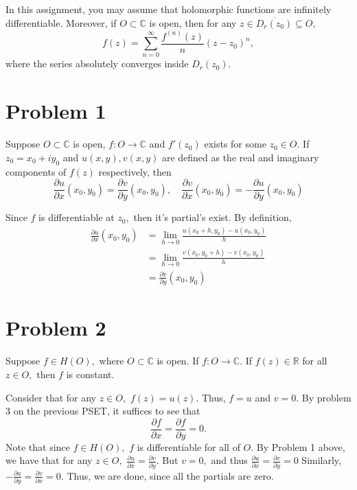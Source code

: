 \documentclass[11pt]{article}
\newcommand{\bbC}{\mathbb{C}}
\newcommand{\bbR}{\mathbb{R}}
\begin{document}
	
	
	\psetheader
In this assignment, you may assume that holomorphic functions are infinitely differentiable. Moreover, if $O \subset \bbC$ is open, then for any $z\in \overline{D_r(z_0)}\subseteq O,$ 
\[f(z) = \sum_{n=0}^\infty \frac{f^{(n)}(z)}{n}(z - z_0)^n,\] where the series absolutely converges inside $D_r(z_0).$ 
\section*{Problem 1}
\begin{problem}
    Suppose $O\subset \bbC$ is open, $f: O \to \bbC$ and $f'(z_0)$ exists for some $z_0 \in O.$ If $z_0 = x_0 + iy_0$ and $u(x,y), v(x,y)$ are defined as the real and imaginary components of $f(z)$ respectively, then 
    \[\frac{\partial u}{\partial x}(x_0, y_0) = \frac{\partial v}{\partial y}(x_0, y_0), \quad \frac{\partial v}{\partial x}(x_0, y_0) = -\frac{\partial u}{\partial y}(x_0, y_0)\]
\end{problem}
\begin{solution}
Since $f$ is differentiable at $z_0,$ then it's partial's exist. 
    By definition,
    \begin{align*}
        \frac{\partial u}{\partial x}(x_0, y_0) &= \lim_{h\to 0}\frac{u(x_0 + h, y_0) - u(x_0, y_0)}{h}\\
        
        &= \lim_{h\to 0} \frac{v(x_0, y_0 + h) - v(x_0, y_0)}{h}\\
        &= \frac{\partial v}{\partial y}(x_0, y_0)
    \end{align*}
\end{solution}

\newpage
\section*{Problem 2}
\begin{problem}
    Suppose $f \in H(O),$ where $O\subset \bbC$ is open. If $f: O \to \bbC.$ If $f(z) \in \bbR$ for all $z\in O,$ then $f$ is constant.
\end{problem}
\begin{solution}
Consider that for any $z\in O,$ $f(z) = u(z).$ Thus, $f = u$ and $v = 0.$
 By problem 3 on the previous PSET, it suffices to see that 
    \[\frac{\partial f}{\partial x} = \frac{\partial f}{\partial y} = 0.\] Note that since $f\in H(O),$ $f$ is differentiable for all of $O.$ By Problem 1 above, we have that for any $z\in O,$ 
    $\frac{\partial u}{\partial x} = \frac{\partial v}{\partial y}.$ But $v = 0,$ and thus $\frac{\partial u}{\partial x} = \frac{\partial v}{\partial y} = 0$ Similarly, $-\frac{\partial u}{\partial y} = \frac{\partial v}{\partial x} = 0.$ Thus, we are done, since all the partials are zero.
\end{solution}
\end{document}
